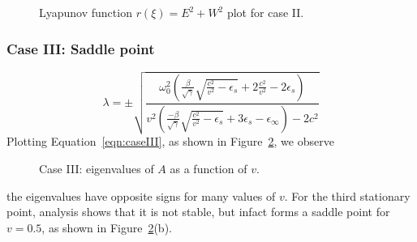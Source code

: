 \documentclass{article}[12pt]
\theoremstyle{plain}
\begin{document}
\begin{figure}[htb]
\begin{center}
\subfigure[$(E,W)=(-0.6,0)$]{\texttt{[image: C2\_C0]}}
\caption{Lyapunov function $r(\xi)=E^2+W^2$ plot for case II.}
\label{fig:CY2}
\end{center}
\end{figure}


\subsubsection{Case III: Saddle point}
\[
\lambda  =  \pm \sqrt{\frac{\omega_0^2 (\frac{\beta}{\sqrt{\gamma}}\sqrt{\frac{c^2}{v^2}-\epsilon_s} + 2\frac{c^2}{v^2} - 2\epsilon_s)}
{v^2(\frac{-\beta}{\sqrt{\gamma}}\sqrt{\frac{c^2}{v^2}-\epsilon_s} + 3\epsilon_s - \epsilon_\infty) -2c^2}}
\]
Plotting Equation~\ref{eqn:caseIII}, as shown in Figure~\ref{fig:caseIII}, we observe 
\begin{figure}[htb]
\begin{center}
\caption{Case III: eigenvalues of $A$ as a function of $v$.}
\label{fig:caseIII}
\end{center}
\end{figure}
the eigenvalues have opposite signs for many values of $v$.
For the third stationary point, analysis shows that it is not stable, but infact forms a saddle point for $v=0.5$, as shown
in Figure~\ref{fig:caseIII}(b).
\end{document}
